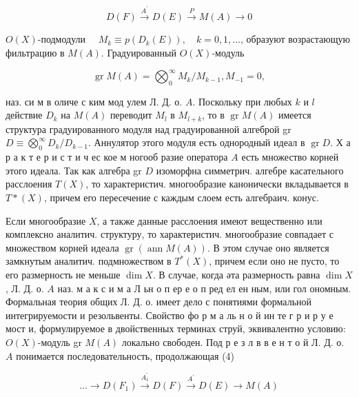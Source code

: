 \documentclass[10pt]{article}
\begin{document}
\[

D(F) \stackrel{A^{\prime}}{\longrightarrow} D(E) \stackrel{P}{\longrightarrow} M(A) \longrightarrow 0

\]



$O(X)$-подмодули $\quad M_{k} \equiv p\left(D_{k}(E)\right), \quad k=0,1, \ldots$, образуют возрастающую фильтрацию в $M(A)$. Градуированный $O(X)$-модуль



\[

\operatorname{gr} M(A)=\bigotimes_{0}^{\infty} M_{k} / M_{k-1}, M_{-1}=0,

\]



наз. си м в оличе с ким мод улем Л. Д. о. $A$. Поскольку при любых $k$ и $l$ действие $D_{k}$ на $M(A)$ переводит $M_{l}$ в $M_{l+k}$, то в $\operatorname{gr} M(A)$ имеется структура градуированного модуля над градуированной алгеброй gr $D \equiv \bigotimes_{0}^{\infty} D_{k} / D_{k-1}$. Аннулятор этого модуля есть однородный идеал в $\operatorname{gr} D$. Х а р а к т е р и с т и ч ес кое м ногооб разие оператора $A$ есть множество корней этого идеала. Так как алгебра gr $D$ изоморфна симметрич. алгебре касательного расслоения $T(X)$, то характеристич. многообразие канонически вкладывается в $T *(X)$, причем его пересечение с каждым слоем есть алгебраич. конус.



Если многообразие $X$, а также данные расслоения имеют вещественно или комплексно аналитич. структуру, то характеристич. многообразие совпадает с множеством корней идеала $\operatorname{gr}(\operatorname{ann} M(A))$. В этом случае оно является замкнутым аналитич. подмножеством в $T^{*}(X)$, причем если оно не пусто, то его размерность не меньше $\operatorname{dim} X$. В случае, когда әта размерность равна $\operatorname{dim} X$, Л. Д. о. $A$ наз. м а к с и м а Л ьн о п ер е о п ред ел ен ным, или гол ономным. Формальная теория общих Л. Д. о. имеет дело с понятиями формальной интегрируемости и резольвенты. Свойство фо р м а ль н о й ин те г р и р у е мост и, формулируемое в двойственных терминах струй, эквивалентно условию: $O(X)$-модуль gr $M(A)$ локально свободен. Под р е з л в в е н т о й Л. Д. о. $A$ понимается последовательность, продолжающая (4)



\[

\ldots \longrightarrow D\left(F_{1}\right) \stackrel{A_{1}^{\prime}}{\longrightarrow} D(F) \stackrel{A^{\prime}}{\longrightarrow} D(E) \longrightarrow M(A)

\]
\end{document}
